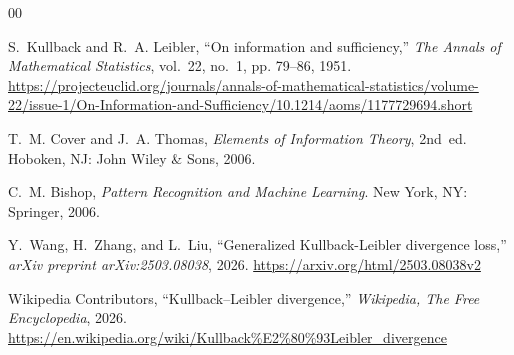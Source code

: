 \documentclass[conference]{IEEEtran}
\begin{document}
	\begin{thebibliography}{00}
		
		S.~Kullback and R.~A. Leibler, ``On information and sufficiency,'' \emph{The Annals of Mathematical Statistics}, vol.~22, no.~1, pp. 79--86, 1951. \url{https://projecteuclid.org/journals/annals-of-mathematical-statistics/volume-22/issue-1/On-Information-and-Sufficiency/10.1214/aoms/1177729694.short}
		
		T.~M. Cover and J.~A. Thomas, \emph{Elements of Information Theory}, 2nd~ed. Hoboken, NJ: John Wiley \& Sons, 2006.
		
		C.~M. Bishop, \emph{Pattern Recognition and Machine Learning}. New York, NY: Springer, 2006.
		
		Y.~Wang, H.~Zhang, and L.~Liu, ``Generalized Kullback-Leibler divergence loss,'' \emph{arXiv preprint arXiv:2503.08038}, 2026. \url{https://arxiv.org/html/2503.08038v2}
		
		Wikipedia Contributors, ``Kullback–Leibler divergence,'' \emph{Wikipedia, The Free Encyclopedia}, 2026. \url{https://en.wikipedia.org/wiki/Kullback%E2%80%93Leibler_divergence}
		
	\end{thebibliography}
	
\end{document}
